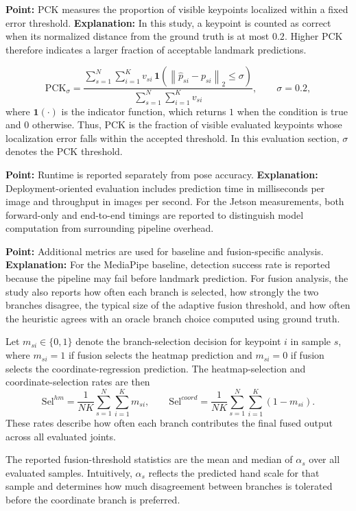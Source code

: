 \documentclass[10pt,letterpaper]{article}
\begin{document}
\medskip
\noindent\textbf{Point:} PCK measures the proportion of visible keypoints localized within a fixed error threshold.  
\textbf{Explanation:} In this study, a keypoint is counted as correct when its normalized distance from the ground truth is at most \(0.2\). Higher PCK therefore indicates a larger fraction of acceptable landmark predictions.

\[
\mathrm{PCK}_{\sigma} =
\frac{
\sum_{s=1}^{N}
\sum_{i=1}^{K}
v_{si}\,\mathbf{1}
\left(
\left\|
\hat{p}_{si} - p_{si}
\right\|_2 \le \sigma
\right)
}{
\sum_{s=1}^{N}
\sum_{i=1}^{K}
v_{si}
},
\qquad \sigma = 0.2,
\]
where \(\mathbf{1}(\cdot)\) is the indicator function, which returns \(1\) when the condition is true and \(0\) otherwise. Thus, PCK is the fraction of visible evaluated keypoints whose localization error falls within the accepted threshold. In this evaluation section, \(\sigma\) denotes the PCK threshold.

\medskip
\noindent\textbf{Point:} Runtime is reported separately from pose accuracy.  
\textbf{Explanation:} Deployment-oriented evaluation includes prediction time in milliseconds per image and throughput in images per second. For the Jetson measurements, both forward-only and end-to-end timings are reported to distinguish model computation from surrounding pipeline overhead.

\medskip
\noindent\textbf{Point:} Additional metrics are used for baseline and fusion-specific analysis.  
\textbf{Explanation:} For the MediaPipe baseline, detection success rate is reported because the pipeline may fail before landmark prediction. For fusion analysis, the study also reports how often each branch is selected, how strongly the two branches disagree, the typical size of the adaptive fusion threshold, and how often the heuristic agrees with an oracle branch choice computed using ground truth.

Let \(m_{si} \in \{0,1\}\) denote the branch-selection decision for keypoint \(i\) in sample \(s\), where \(m_{si}=1\) if fusion selects the heatmap prediction and \(m_{si}=0\) if fusion selects the coordinate-regression prediction. The heatmap-selection and coordinate-selection rates are then
\[
\mathrm{Sel}^{hm} =
\frac{1}{NK}
\sum_{s=1}^{N}\sum_{i=1}^{K} m_{si},
\qquad
\mathrm{Sel}^{coord} =
\frac{1}{NK}
\sum_{s=1}^{N}\sum_{i=1}^{K} (1-m_{si}).
\]
These rates describe how often each branch contributes the final fused output across all evaluated joints.

The reported fusion-threshold statistics are the mean and median of \(\alpha_s\) over all evaluated samples. Intuitively, \(\alpha_s\) reflects the predicted hand scale for that sample and determines how much disagreement between branches is tolerated before the coordinate branch is preferred.
\end{document}
